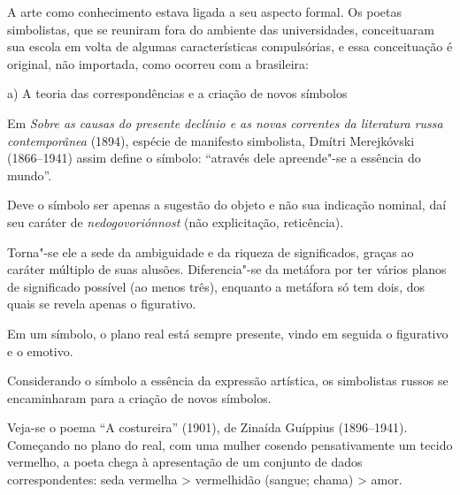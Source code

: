 A arte como conhecimento estava ligada a seu aspecto formal. Os poetas
simbolistas, que se reuniram fora do ambiente das universidades,
conceituaram sua escola em volta de algumas características
compulsórias, e essa conceituação é original, não importada, como
ocorreu com a brasileira:

\begin{flushleft}
a) A teoria das correspondências e a criação de novos símbolos
\end{flushleft}

Em \emph{Sobre as causas do presente declínio e as novas correntes da
literatura russa contemporânea} (1894), espécie de manifesto
simbolista, Dmítri Merejkóvski (1866--1941) assim define o símbolo:
``através dele apreende"-se a essência do mundo''.

Deve o símbolo ser apenas a sugestão do objeto e não sua indicação
nominal, daí seu caráter de \emph{nedogovoriónnost} (não explicitação,
reticência).

Torna"-se ele a sede da ambiguidade e da riqueza de significados, graças
ao caráter múltiplo de suas alusões. Diferencia"-se da metáfora por ter
vários planos de significado possível (ao menos três), enquanto a
metáfora só tem dois, dos quais se revela apenas o figurativo.

Em um símbolo, o plano real está sempre presente, vindo em seguida o
figurativo e o emotivo.

Considerando o símbolo a essência da expressão artística, os simbolistas
russos se encaminharam para a criação de novos símbolos.

Veja-se o poema ``A costureira'' (1901), de Zinaída Guíppius
(1896--1941). Começando no plano do real, com uma mulher cosendo
pensativamente um tecido vermelho, a poeta chega à apresentação de um
conjunto de dados correspondentes: seda vermelha \textgreater{}
vermelhidão (sangue; chama) \textgreater{} amor.

